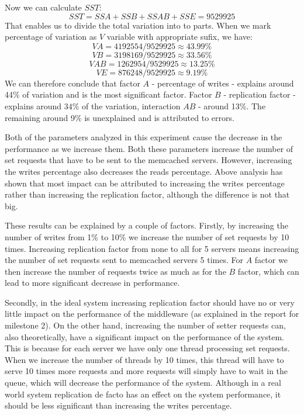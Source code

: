 \documentclass[11pt]{article}
\begin{document}
Now we can calculate $SST$:
$$SST = SSA + SSB + SSAB + SSE = 9529925$$
That enables us to divide the total variation into to parts. When we mark percentage of variation as $V$ variable with appropriate sufix, we have:
$$VA =  4192554/ 9529925 \approx 43.99\%$$
$$VB =  3198169 / 9529925 \approx 33.56\%$$
$$VAB =  1262954 / 9529925 \approx 13.25\%$$
$$VE =  876248 / 9529925 \approx 9.19\%$$
We can therefore conclude that factor $A$ - percentage of writes - explains around 44\% of variation and is the most significant factor. Factor $B$ - replication factor - explains  around $34\%$ of the variation, interaction $AB$ - around 13\%. The remaining around 9\% is unexplained and is attributed to errors.

Both of the parameters analyzed in this experiment cause the decrease in the performance as we increase them. Both these parameters increase the number of set requests that have to be sent to the memcached servers. However, increasing the writes percentage also decreases the reads percentage. Above analysis has shown that most impact can be attributed to increasing the writes percentage rather than increasing the replication factor, although the difference is not that big.

These results can be explained by a couple of factors. Firstly, by increasing the number of writes from 1\% to 10\% we increase the number of set requests by 10 times. Increasing replication factor from none to all for 5 servers means increasing the number of set requests sent to memcached servers 5 times. For $A$ factor we then increase the number of requests twice as much as for the $B$ factor, which can lead to more significant decrease in performance.

Secondly, in the ideal system increasing replication factor should have no or very little impact on the performance of the middleware (as explained in the report for milestone 2). On the other hand, increasing the number of setter requests can, also theoretically, have a significant impact on the performance of the system. This is because for each server we have only one thread processing set requests. When we increase the number of threads by 10 times, this thread will have to serve 10 times more requests and more requests will simply have to wait in the queue, which will decrease the performance of the system. Although in a real world system replication de facto has an effect on the system performance, it should be less significant than increasing the writes percentage. 
\end{document}
